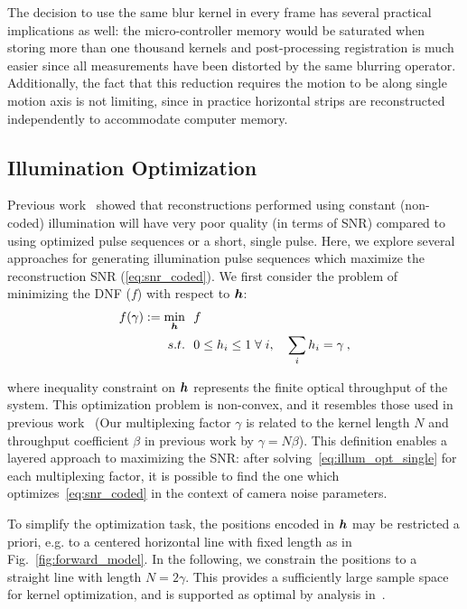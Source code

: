 The decision to use the same blur kernel in every frame has several practical implications as well: the micro-controller memory would be saturated when storing more than one thousand kernels and post-processing registration is much easier since all measurements have been distorted by the same blurring operator. Additionally, the fact that this reduction requires the motion to be along single motion axis is not limiting, since in practice horizontal strips are reconstructed independently to accommodate computer memory. 

\subsection{Illumination Optimization}\label{sec:highthroughput:illum_opt}
Previous work~\cite{raskar2006coded, agrawal2009optimal} showed that reconstructions performed using constant (non-coded) illumination will have very poor quality (in terms of SNR) compared to using optimized pulse sequences or a short, single pulse. Here, we explore several approaches for generating illumination pulse sequences which maximize the reconstruction SNR (\eqref{eq:snr_coded}). We first consider the problem of minimizing the DNF ($f$) with respect to $\bm{h}$:
\begin{align}
    \begin{split}
        \label{eq:illum_opt_single}
        f(\gamma) := \min_{\bm{h}}&~~ f \\
          s.t. &~~0 \leq h_i \leq 1 \; \forall \; i, \quad
          \sum_{i} h_i = \gamma \:,
    \end{split}
\end{align}

\noindent where inequality constraint on $\bm{h}$ represents the finite optical throughput of the system. 
This optimization problem is non-convex, and it resembles those used in previous work~\cite{raskar2006coded,agrawal2009optimal,Ma:15} (Our multiplexing factor $\gamma$ is related to the kernel length $N$ and throughput coefficient $\beta$ in previous work by $\gamma = N\beta$). This definition enables a layered approach to maximizing the SNR: after solving~\eqref{eq:illum_opt_single} for each multiplexing factor, it is possible to find the one which optimizes~\eqref{eq:snr_coded} in the context of camera noise parameters.

To simplify the optimization task, the positions encoded in $\bm{h}$ may be restricted a priori, e.g. to a centered horizontal line with fixed length as in Fig.~\ref{fig:forward_model}. In the following, we constrain the positions to a straight line with length $N=2\gamma$. This provides a sufficiently large sample space for kernel optimization, and is supported as optimal by analysis in~\cite{agrawal2009optimal}.

